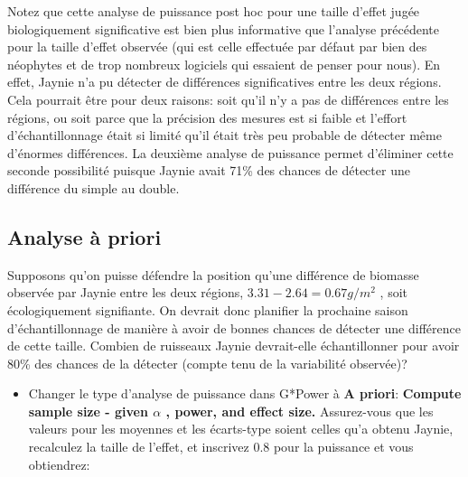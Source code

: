 \documentclass[12pt,]{book}
\providecommand{\tightlist}{%
  \setlength{\itemsep}{0pt}\setlength{\parskip}{0pt}}
\begin{document}
Notez que cette analyse de puissance post hoc pour une taille d'effet jugée biologiquement significative est bien plus informative que l'analyse précédente pour la taille d'effet observée (qui est celle effectuée par défaut par bien des néophytes et de trop nombreux logiciels qui essaient de penser pour nous).
En effet, Jaynie n'a pu détecter de différences significatives entre les deux régions.
Cela pourrait être pour deux raisons: soit qu'il n'y a pas de différences entre les régions, ou soit parce que la précision des mesures est si faible et l'effort d'échantillonnage était si limité qu'il était très peu probable de détecter même d'énormes différences.
La deuxième analyse de puissance permet d'éliminer cette seconde possibilité puisque Jaynie avait 71\% des chances de détecter une différence du simple au double.

\hypertarget{analyse-uxe0-priori}{%
\subsection{Analyse à priori}\label{analyse-uxe0-priori}}

Supposons qu'on puisse défendre la position qu'une différence de biomasse observée par Jaynie entre les deux régions, \(3.31- 2.64=0.67g/m^2\) , soit écologiquement signifiante.
On devrait donc planifier la prochaine saison d'échantillonnage de manière à avoir de bonnes chances de détecter une différence de cette taille.
Combien de ruisseaux Jaynie devrait-elle échantillonner pour avoir 80\% des chances de la détecter (compte tenu de la variabilité observée)?

\begin{itemize}
\tightlist
\item
  Changer le type d'analyse de puissance dans G*Power à \textbf{A priori}: \textbf{Compute sample size - given \(\alpha\) , power, and effect size.}
  Assurez-vous que les valeurs pour les moyennes et les écarts-type soient celles qu'a obtenu Jaynie, recalculez la taille de l'effet, et inscrivez 0.8 pour la puissance et vous obtiendrez:
\end{itemize}
\end{document}
